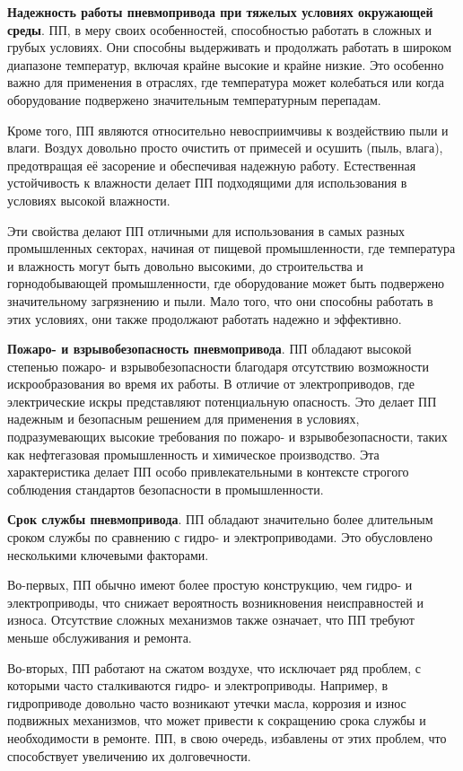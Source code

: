 \textbf{Надежность работы пневмопривода при тяжелых условиях окружающей среды}. ПП, в меру своих
особенностей, способностью работать в сложных и грубых условиях. Они способны выдерживать и продолжать
работать в широком диапазоне температур, включая крайне высокие и крайне низкие. Это особенно важно
для применения в отраслях, где температура может колебаться или когда оборудование подвержено
значительным температурным перепадам.

Кроме того, ПП являются относительно невосприимчивы к воздействию пыли и влаги. Воздух довольно просто
очистить от примесей и осушить (пыль, влага), предотвращая её засорение и обеспечивая надежную работу.
Естественная устойчивость к влажности делает ПП подходящими для использования в условиях высокой влажности.

Эти свойства делают ПП отличными для использования в самых разных промышленных секторах, начиная
от пищевой промышленности, где температура и влажность могут быть довольно высокими, до строительства и
горнодобывающей промышленности, где оборудование может быть подвержено значительному загрязнению и пыли.
Мало того, что они способны работать в этих условиях, они также продолжают работать надежно и эффективно.

\textbf{Пожаро- и взрывобезопасность пневмопривода}.
ПП обладают высокой степенью пожаро- и взрывобезопасности
благодаря отсутствию возможности искрообразования во время их работы.
В отличие от электроприводов, где электрические искры представляют потенциальную опасность.
Это делает ПП надежным и безопасным решением для применения в условиях, подразумевающих
высокие требования по пожаро- и взрывобезопасности, таких как нефтегазовая промышленность и химическое
производство. Эта характеристика делает ПП особо привлекательными в контексте строгого соблюдения
стандартов безопасности в промышленности.

\textbf{Срок службы пневмопривода}.
ПП обладают значительно более длительным сроком службы по сравнению с гидро- и электроприводами.
Это обусловлено несколькими ключевыми факторами.

Во-первых, ПП обычно имеют более простую конструкцию,
чем гидро- и электроприводы, что снижает вероятность возникновения неисправностей и износа. Отсутствие сложных
механизмов также означает, что ПП требуют меньше обслуживания и ремонта.

Во-вторых, ПП работают на сжатом воздухе, что исключает ряд проблем, с которыми часто сталкиваются
гидро- и электроприводы. Например, в гидроприводе довольно часто возникают утечки масла,
коррозия и износ подвижных механизмов, что может привести к сокращению срока службы и необходимости в ремонте.
ПП, в свою очередь, избавлены от этих проблем, что способствует увеличению их долговечности.

